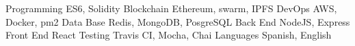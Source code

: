 


\begin{cvskills}

\cvskill
{Programming} %
{ES6, Solidity} %
\cvskill
{Blockchain} %
{Ethereum, swarm, IPFS} %
\cvskill
{DevOps} %
{AWS, Docker, pm2} %
\cvskill
{Data Base} %
{Redis, MongoDB, PosgreSQL} %
\cvskill
{Back End} %
{NodeJS, Express} %
\cvskill
{Front End} %
{React} %
\cvskill
{Testing} %
{Travis CI, Mocha, Chai} %
\cvskill
{Languages} %
{Spanish, English} %
\end{cvskills}
